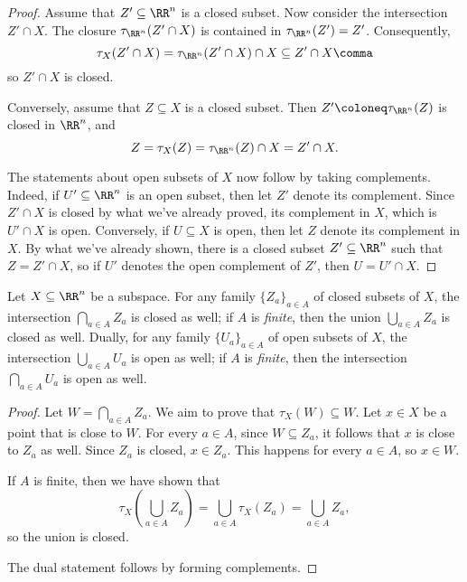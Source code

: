 \begin{proof}
	Assume that $Z' \subseteq \RR^n$ is a closed subset.
	Now consider the intersection $Z' \cap X$.
	The closure $\tau_{\RR^n}(Z' \cap X)$ is contained in $\tau_{\RR^n}(Z') = Z'$.
	Consequently,
	\[
		\tau_X(Z'\cap X) = \tau_{\RR^n}(Z'\cap X) \cap X \subseteq Z' \cap X \comma
	\]
	so $Z' \cap X $ is closed.
	
	Conversely, assume that $Z \subseteq X$ is a closed subset.
	Then $Z' \coloneq \tau_{\RR^n}(Z)$ is closed in $\RR^n$, and
	\[
		Z = \tau_X(Z) = \tau_{\RR^n}(Z) \cap X = Z' \cap X.
	\]

	The statements about open subsets of $X$ now follow by taking complements.%
	Indeed, if $U' \subseteq \RR^n$ is an open subset, then let $Z' $ denote its complement.
	Since $Z'\cap X$ is closed by what we've already proved, its complement in $X$, which is $U' \cap X$ is open.
	Conversely, if $U \subseteq X$ is open, then let $Z$ denote its complement in $X$.
	By what we've already shown, there is a closed subset $Z' \subseteq \RR^n$ such that $Z = Z' \cap X$, so if $U'$ denotes the open complement of $Z'$, then $U = U'\cap X$.
\end{proof}

\begin{prp}%
\label{prp:stability_properties_of_closeds_and_opens}
	Let $ X \subseteq \RR^n$ be a subspace.
	For any family $\{Z_a\}_{a\in A}$ of closed subsets of $X$, the intersection $ \bigcap_{a\in A} Z_a $ is closed as well;
	if $A$ is \emph{finite}, then the union $\bigcup_{a\in A} Z_a $ is closed as well.
	Dually, for any family $\{U_a\}_{a\in A}$ of open subsets of $X$, the intersection $ \bigcup_{a\in A} U_a $ is open as well;
	if $A$ is \emph{finite}, then the intersection $\bigcap_{a\in A} U_a $ is open as well.
\end{prp}

\begin{proof}
	Let $W = \bigcap_{a\in A} Z_a$.
	We aim to prove that $\tau_X(W) \subseteq W$.
	Let $x \in X$ be a point that is close to $W$.
	For every $a \in A$, since $W \subseteq Z_a$, it follows that $x$ is close to $Z_a$ as well.
	Since $Z_a$ is closed, $x \in Z_a$.
	This happens for every $a \in A$, so $x \in W$.

	If $A$ is finite, then we have shown that
	\[
		\tau_X\left(\bigcup_{a \in A} Z_a\right) = \bigcup_{a\in A} \tau_X(Z_a) = \bigcup_{a \in A} Z_a \comma
	\]
	so the union is closed.

	The dual statement follows by forming complements.
\end{proof}

